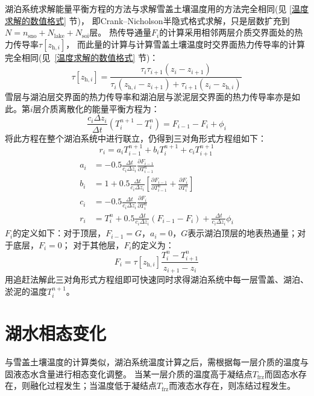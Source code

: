 湖泊系统求解能量平衡方程的方法与求解雪盖土壤温度用的方法完全相同(见 \ref{温度求解的数值格式} 节)，
即Crank--Nicholson半隐式格式求解，只是层数扩充到$N=n_{\mathrm{sno}}+N_{\mathrm{lake}}+N_{\mathrm{soi}}$层。
热传导通量$F_i$的计算采用相邻两层介质交界面处的热力传导率$\tau\left[z_{\mathrm{h},i}\right]$，
而此量的计算与计算雪盖土壤温度时交界面热力传导率的计算完全相同(见~\ref{温度求解的数值格式} 节)：
\begin{equation}
  \tau\left[z_{\mathrm{h},i}\right]=\frac{\tau_i\tau_{i+1}\left(z_i-z_{i+1}\right)}{\tau_i\left(z_{\mathrm{h},i}-z_{i+1}\right)
  +\tau_{i+1}\left(z_i-z_{\mathrm{h},i}\right)}
\end{equation}
雪层与湖泊层交界面的热力传导率和湖泊层与淤泥层交界面的热力传导率亦是如此。第$i$层介质离散化的能量平衡方程为：
\begin{equation}
  \frac{c_{i} \Delta z_{i}}{\Delta t}\left(T_{i}^{n+1}-T_{i}^{n}\right)=F_{i-1}-F_{i}+\phi_{i}
\end{equation}
将此方程在整个湖泊系统中进行联立，仍得到三对角形式方程组如下：
\begin{equation}
  r_{i}=a_{i} T_{i-1}^{n+1}+b_{i} T_{i}^{n+1}+c_{i} T_{i+1}^{n+1}
\end{equation}
\begin{equation}
  \begin{aligned}
    a_{i} &=-0.5 \frac{\Delta t}{c_{i} \Delta z_{i}}\frac{\partial F_{i-1}}{\partial T_{i-1}^{n}} \\
    b_{i} &=1+0.5 \frac{\Delta t}{c_{i} \Delta z_{i}}\left[\frac{\partial F_{i-1}}{\partial T_{i-1}^{n}}+\frac{\partial F_{i}}{\partial T_{i}^{n}}\right] \\
    c_{i} &=-0.5 \frac{\Delta t}{c_{i} \Delta z_{i}} \frac{\partial F_{i}}{\partial T_{i}^{n}} \\
    r_{i} &=T_{i}^{n}+0.5 \frac{\Delta t}{c_{i} \Delta z_{i}}\left(F_{i-1}-F_{i}\right)+\frac{\Delta t}{c_{i}\Delta z_{i}} \phi_{i}
  \end{aligned}
\end{equation}
$F_i$的定义如下：对于顶层，$F_{i-1}=G$，$a_i=0$，$G$表示湖泊顶层的地表热通量；对于底层，$F_i=0$；
对于其他层，$F_i$的定义为：
\begin{equation}
  F_{i}=\tau\left[z_{\mathrm{h},i}\right] \frac{T_{i}^{n}-T_{i+1}^{n}}{z_{i+1}-z_{i}}
\end{equation}
用追赶法解此三对角形式方程组即可快速同时求得湖泊系统中每一层雪盖、湖泊、淤泥的温度$T_i^{n+1}$。
\section{湖水相态变化}\label{湖水相态变化}
与雪盖土壤温度的计算类似，湖泊系统温度计算之后，需根据每一层介质的温度与固液态水含量进行相态变化调整。
当某一层介质的温度高于凝结点$T_{\mathrm {frz}} $而固态水存在，则融化过程发生；当温度低于凝结点$T_{\mathrm {frz}} $而液态水存在，则冻结过程发生。

